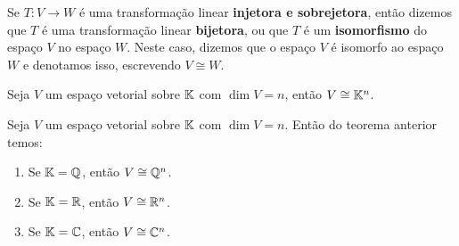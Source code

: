\documentclass{beamer}
\begin{document}
%
%

    \begin{frame}
        \begin{definicao}
            Se $T \colon V \to W$ é uma transformação linear \pause \textbf{injetora e sobrejetora}, \pause então dizemos que $T$ é uma
            transformação linear \textbf{bijetora}, \pause ou que $T$ é um \textbf{isomorfismo} \pause do espaço $V$ no espaço $W$.
            \pause Neste caso, dizemos que o espaço $V$ é isomorfo ao espaço $W$ \pause e denotamos isso, escrevendo $V \cong W$.\pause
        \end{definicao}

        \begin{teorema}
            Seja $V$ um espaço vetorial sobre $\mathbb{K}$ \pause com $\dim V = n$, \pause então $V \cong \mathbb{K}^n$.
        \end{teorema}
    \end{frame}

    \begin{frame}
        \begin{observacoes}
            Seja $V$ um espaço vetorial sobre $\mathbb{K}$ \pause com $\dim V = n$. \pause Então do teorema anterior temos:\pause
            \begin{enumerate}[label={\roman*})]
                \vspace*{.25cm}
                \item Se $\mathbb{K} = \mathbb{Q}$, \pause então $V \cong \mathbb{Q}^n$.\pause

                \vspace{.75cm}

                \item Se $\mathbb{K} = \mathbb{R}$, \pause então $V \cong \mathbb{R}^n$.\pause

                \vspace{.75cm}

                \item Se $\mathbb{K} = \mathbb{C}$, \pause então $V \cong \mathbb{C}^n$.
            \end{enumerate}
        \end{observacoes}
    \end{frame}
\end{document}

